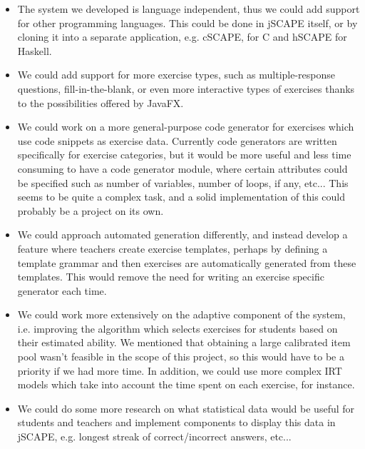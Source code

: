 \begin{itemize}
\item The system we developed is language independent, thus we could add support for other programming languages. This could be done in jSCAPE itself, or by cloning it into a separate application, e.g.  cSCAPE, for C and hSCAPE for Haskell.
\item We could add support for more exercise types, such as multiple-response questions, fill-in-the-blank, or even more interactive types of exercises thanks to the possibilities offered by \textsf{JavaFX}.
\item We could work on a more general-purpose code generator for exercises which use code snippets as exercise data. Currently code generators are written specifically for exercise categories, but it would be more useful and less time consuming to have a code generator module, where certain attributes could be specified such as number of variables, number of loops, if any, etc... This seems to be quite a complex task, and a solid implementation of this could probably be a project on its own.
\item We could approach automated generation differently, and instead develop a feature where teachers create exercise templates, perhaps by defining a template grammar and then exercises are automatically generated from these templates. This would remove the need for writing an exercise specific generator each time.
\item We could work more extensively on the adaptive component of the system, i.e. improving the algorithm which selects exercises for students based on their estimated ability. We mentioned that obtaining a large calibrated item pool wasn't feasible in the scope of this project, so this would have to be a priority if we had more time. In addition, we could use more complex IRT models which take into account the time spent on each exercise, for instance.
\item We could do some more research on what statistical data would be useful for students and teachers and implement components to display this data in jSCAPE, e.g. longest streak of correct/incorrect answers, etc...
\end{itemize}